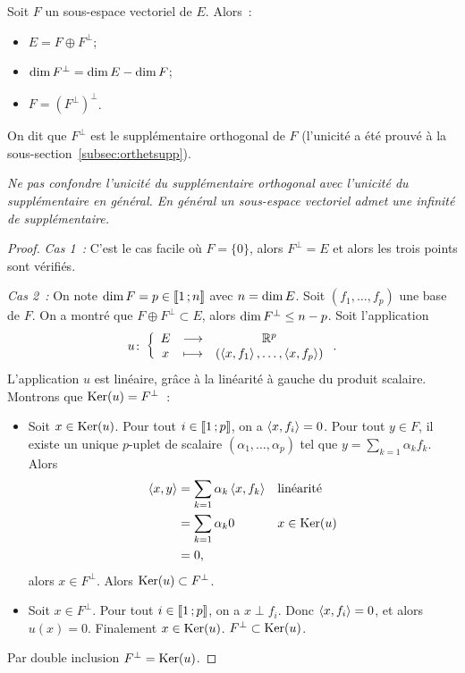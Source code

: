 \begin{theo}
  Soit $F$ un sous-espace vectoriel de $E$. Alors~:
  \begin{itemize}
  \item $E=F\oplus F^\perp$;
  \item $\operatorname{dim} F^\perp = \operatorname{dim} E - \operatorname{dim} F$;
  \item $F=(F^\perp)^\perp$.
  \end{itemize}
  On dit que $F^\perp$ est le supplémentaire orthogonal de $F$ (l'unicité a été prouvé à la sous-section~\ref{subsec:orthetsupp}). 
\end{theo}
\emph{Ne pas confondre l'unicité du supplémentaire orthogonal avec l'unicité du supplémentaire en général. En général un sous-espace vectoriel admet une infinité de supplémentaire.}
\begin{proof}
  \emph{Cas 1~:} C'est le cas facile où $F=\{0\}$, alors $F^\perp =E$ et alors les trois points sont vérifiés.

  \emph{Cas 2~:} On note $\operatorname{dim} F=p \in \mathopen{\llbracket}1\mathclose{}\mathpunct{};n\mathclose{\rrbracket}$ avec $n = \operatorname{dim} E$. Soit $(f_1, \ldots, f_p)$ une base de $F$. On a montré que $F \oplus F^\perp \subset E$, alors $\operatorname{dim} F^\perp \leq n-p$. Soit l'application
  \begin{equation}
    u\colon \left\{\begin{array}{ccc} E & \longrightarrow &\mathbb{R}^p\\ x & \longmapsto & (\left\langle{x},{f_1}\right\rangle, \ldots, \left\langle{x},{f_p}\right\rangle) \end{array} \right..
  \end{equation}
  L'application $u$ est linéaire, grâce à la linéarité à gauche du produit scalaire. Montrons que $\operatorname{Ker}(u)=F^\perp$~:
  \begin{itemize}
  \item Soit $x \in \operatorname{Ker}(u)$. Pour tout $i \in \mathopen{\llbracket}1\mathclose{}\mathpunct{};p\mathclose{\rrbracket}$, on a $\left\langle{x},{f_i}\right\rangle=0$. Pour tout $y \in F$, il existe un unique $p$-uplet de scalaire $(\alpha_1, \ldots, \alpha_p)$ tel que $y = \sum_{k=1}\alpha_k f_k$. Alors
    \begin{align}
      \left\langle{x},{y}\right\rangle &= \sum_{k=1}\alpha_k \left\langle{x},{f_k}\right\rangle && \text{linéarité} \\
      &=\sum_{k=1}\alpha_k 0 && x \in \operatorname{Ker}(u) \\
      &=0,
    \end{align}
    alors $x \in F^\perp$. Alors $\operatorname{Ker}(u) \subset F^\perp$.
  \item Soit $x \in F^\perp$. Pour tout $i \in \mathopen{\llbracket}1\mathclose{}\mathpunct{};p\mathclose{\rrbracket}$, on a $x\perp f_i$. Donc $\left\langle{x},{f_i}\right\rangle=0$, et alors $u(x)=0$. Finalement $x \in \operatorname{Ker}(u)$. $F^\perp \subset \operatorname{Ker}(u)$.
  \end{itemize}
  Par double inclusion $F^\perp = \operatorname{Ker}(u)$.


\end{proof}
